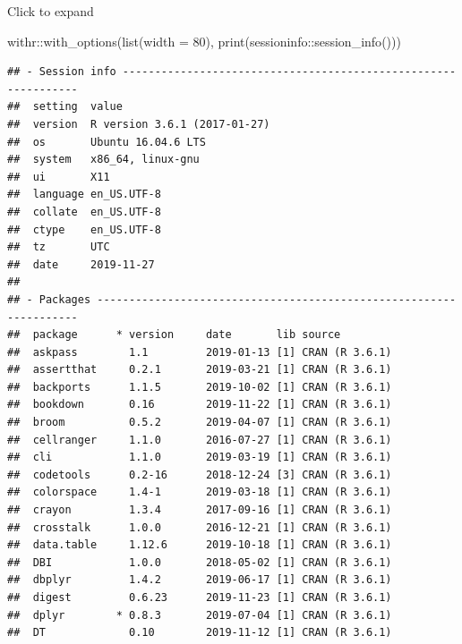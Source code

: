 \documentclass[]{book}
\newenvironment{Shaded}{}{}
\newcommand{\DataTypeTok}[1]{#1}
\newcommand{\DecValTok}[1]{#1}
\newcommand{\KeywordTok}[1]{\textcolor[rgb]{0.00,0.00,1.00}{#1}}
\newcommand{\NormalTok}[1]{#1}
\newcommand{\OperatorTok}[1]{#1}
\begin{document}
Click to expand

\begin{Shaded}
\begin{Highlighting}[]
\NormalTok{withr}\OperatorTok{::}\KeywordTok{with_options}\NormalTok{(}\KeywordTok{list}\NormalTok{(}\DataTypeTok{width =} \DecValTok{80}\NormalTok{), }\KeywordTok{print}\NormalTok{(sessioninfo}\OperatorTok{::}\KeywordTok{session_info}\NormalTok{()))}
\end{Highlighting}
\end{Shaded}

\begin{verbatim}
## - Session info ---------------------------------------------------------------
##  setting  value                       
##  version  R version 3.6.1 (2017-01-27)
##  os       Ubuntu 16.04.6 LTS          
##  system   x86_64, linux-gnu           
##  ui       X11                         
##  language en_US.UTF-8                 
##  collate  en_US.UTF-8                 
##  ctype    en_US.UTF-8                 
##  tz       UTC                         
##  date     2019-11-27                  
## 
## - Packages -------------------------------------------------------------------
##  package      * version     date       lib source                           
##  askpass        1.1         2019-01-13 [1] CRAN (R 3.6.1)                   
##  assertthat     0.2.1       2019-03-21 [1] CRAN (R 3.6.1)                   
##  backports      1.1.5       2019-10-02 [1] CRAN (R 3.6.1)                   
##  bookdown       0.16        2019-11-22 [1] CRAN (R 3.6.1)                   
##  broom          0.5.2       2019-04-07 [1] CRAN (R 3.6.1)                   
##  cellranger     1.1.0       2016-07-27 [1] CRAN (R 3.6.1)                   
##  cli            1.1.0       2019-03-19 [1] CRAN (R 3.6.1)                   
##  codetools      0.2-16      2018-12-24 [3] CRAN (R 3.6.1)                   
##  colorspace     1.4-1       2019-03-18 [1] CRAN (R 3.6.1)                   
##  crayon         1.3.4       2017-09-16 [1] CRAN (R 3.6.1)                   
##  crosstalk      1.0.0       2016-12-21 [1] CRAN (R 3.6.1)                   
##  data.table     1.12.6      2019-10-18 [1] CRAN (R 3.6.1)                   
##  DBI            1.0.0       2018-05-02 [1] CRAN (R 3.6.1)                   
##  dbplyr         1.4.2       2019-06-17 [1] CRAN (R 3.6.1)                   
##  digest         0.6.23      2019-11-23 [1] CRAN (R 3.6.1)                   
##  dplyr        * 0.8.3       2019-07-04 [1] CRAN (R 3.6.1)                   
##  DT             0.10        2019-11-12 [1] CRAN (R 3.6.1)                   

\end{verbatim}
\end{document}

